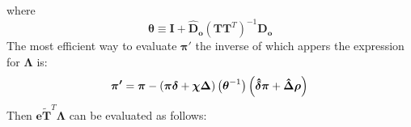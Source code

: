 \documentclass{article}
\begin{document}
where
\begin{equation}
	\boldsymbol{\theta}\equiv\mathbf{I}+
	\mathbf{\hat{D}_o}\left(\mathbf{TT}^T\right)^{-1}\mathbf{D_o}
	\nonumber
\end{equation}
The most efficient way to evaluate $\boldsymbol{\pi}'$ the inverse of which
appers the expression for $\boldsymbol{\Lambda}$ is:
\begin{displaymath}
	\boldsymbol{\pi'}=\boldsymbol{\pi}-
	\left(\boldsymbol{\pi\delta}+\boldsymbol{\chi\Delta}\right)
	\left(\boldsymbol{\theta}^{-1}\right)
	\left(\boldsymbol{\hat{\delta}\pi}+\boldsymbol{\hat{\Delta}\rho}\right)\\
\end{displaymath}
Then $\mathbf{e\tilde{T}}^T\boldsymbol{\Lambda}$ can be evaluated as follows:
\\
\end{document}
